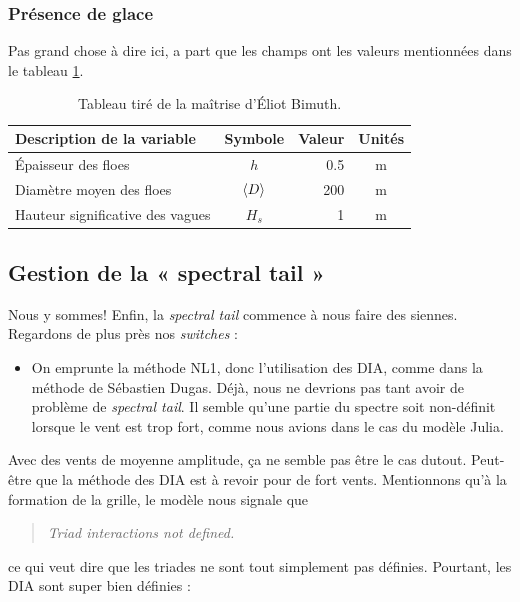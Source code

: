\documentclass[10pt]{article}
\numberwithin{equation}{section}
\begin{document}
\subsubsection{Présence de glace}
\label{sec:org51856c3}

Pas grand chose à dire ici, a part que les champs ont les valeurs mentionnées dans le tableau \ref{tab:org535f41d}.

\begin{table}[!h]
\caption{\label{tab:org535f41d}Tableau tiré de la maîtrise d'Éliot Bimuth.}
\centering
\begin{tabular}{lcrc}
\hline
\hline
Description de la variable & Symbole & Valeur & Unités\\
\hline
Épaisseur des floes & \(h\) & 0.5 & m\\
Diamètre moyen des floes & \(\expval{D}\) & 200 & m\\
Hauteur significative des vagues & \(H_s\) & 1 & m\\
\hline
\end{tabular}
\end{table}
\subsection{Gestion de la « spectral tail »}
\label{sec:orgdaf86cf}

Nous y sommes! Enfin, la \emph{spectral tail} commence à nous faire des siennes. Regardons de plus près nos \emph{switches} :

\begin{itemize}
\item On emprunte la méthode NL1, donc l'utilisation des DIA, comme dans la méthode de Sébastien Dugas. Déjà, nous ne devrions pas tant avoir de problème de \emph{spectral tail}. Il semble qu'une partie du spectre soit non-définit lorsque le vent est trop fort, comme nous avions dans le cas du modèle Julia.
\end{itemize}

Avec des vents de moyenne amplitude, ça ne semble pas être le cas dutout. Peut-être que la méthode des DIA est à revoir pour de fort vents. Mentionnons qu'à la formation de la grille, le modèle nous signale que

\begin{quote}
\emph{Triad interactions not defined.}
\end{quote}

ce qui veut dire que les triades ne sont tout simplement pas définies. Pourtant, les DIA sont super bien définies :
\end{document}
